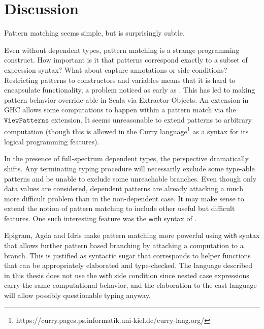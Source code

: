 \section{Discussion}



Pattern matching seems simple, but is surprisingly subtle.

Even without dependent types, pattern matching is a strange programming construct. 
How important is it that patterns correspond exactly to a subset of expression syntax?
What about capture annotations or side conditions?
Restricting patterns to constructors and variables means that it is hard to encapsulate functionality, a problem noticed as early as \cite{10.1145/41625.41653}. 
This has led to making pattern behavior override-able in Scala via Extractor Objects.
An extension in GHC allows some computations to happen within a pattern match via the $\mathtt{ViewPatterns}$ extension.
It seems unreasonable to extend patterns to arbitrary computation (though this is allowed in the Curry language\footnote{https://curry.pages.ps.informatik.uni-kiel.de/curry-lang.org/} as a syntax for its logical programming features). 

In the presence of full-spectrum dependent types, the perspective dramatically shifts.
Any terminating typing procedure will necessarily exclude some type-able patterns and be unable to exclude some unreachable branches.
Even though only data values are considered, dependent patterns are already attacking a much more difficult problem than in the non-dependent case.
It may make sense to extend the notion of pattern matching to include other useful but difficult features.
One such interesting feature was the $\mathsf{with}$ syntax of \cite{mcbride_mckinna_2004}.


Epigram, Agda and Idris make pattern matching more powerful using $\mathsf{with}$ syntax that allows further pattern based branching by attaching a computation to a branch.
This is justified as syntactic sugar that corresponds to helper functions that can be appropriately elaborated and type-checked.
The language described in this thesis does not use the $\mathsf{with}$ side condition since nested case expressions carry the same computational behavior, and the elaboration to the cast language will allow possibly questionable typing anyway.

